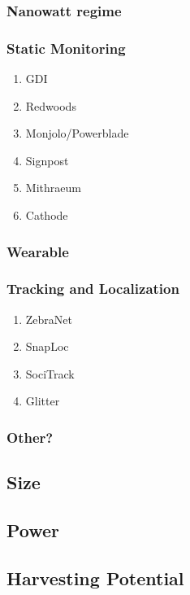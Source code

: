 \subsubsection{Nanowatt regime}
\subsubsection{Static Monitoring}
\begin{enumerate}
    \item GDI ~\cite{mainwaring2002wireless}
    \item Redwoods ~\cite{tolle2005macroscope}
    \item Monjolo/Powerblade
    \item Signpost ~\cite{adkins2018signpost}
    \item Mithraeum ~\cite{afanasov2020battery}
    \item Cathode ~\cite{jagtap2021repurposing}
\end{enumerate}
\subsubsection{Wearable}
\subsubsection{Tracking and Localization}
\begin{enumerate}
    \item ZebraNet ~\cite{juang2002energy}
    \item SnapLoc ~\cite{grossiwindhager2019snaploc}
    \item SociTrack ~\cite{biri2020socitrack}
    \item Glitter ~\cite{sharma2020all}
\end{enumerate}
\subsubsection{Other?}

\subsection{Size}

\subsection{Power}

\subsection{Harvesting Potential}

